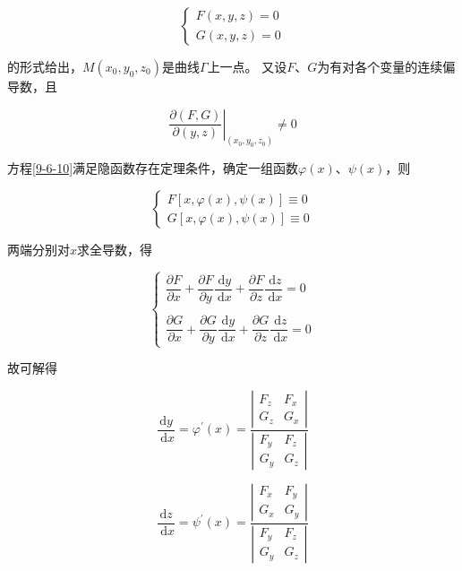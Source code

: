 \documentclass[12pt, a4paper]{article}
\numberwithin{equation}{section}
\begin{document}
    \begin{equation}
        \left\{\begin{array}{l}
            F(x, y, z)=0 \\
            G(x, y, z)=0
        \end{array}\right.
        \label{9-6-10}
    \end{equation}

    的形式给出，\(M\left(x_0,y_0,z_0\right)\)是曲线\(\varGamma\)上一点。
    又设\(F\)、\(G\)为有对各个变量的连续偏导数，且

    $$
        \left.\frac{\partial(F, G)}{\partial(y, z)}\right|_{\left(x_0, y_0, z_0\right)} \neq 0
    $$

    方程\ref{9-6-10}满足隐函数存在定理条件，确定一组函数\(\varphi(x)\)、\(\psi(x)\)，则

    $$
        \left\{\begin{array}{l}
            F[x, \varphi(x), \psi(x)] \equiv 0 \\
            G[x, \varphi(x), \psi(x)] \equiv 0
        \end{array}\right.
    $$

    两端分别对\(x\)求全导数，得

    $$
        \left\{\begin{array}{l}
            \dfrac{\partial F}{\partial x}+\dfrac{\partial F}{\partial y} \dfrac{\mathrm{~d} y}{\mathrm{~d} x}+
                \dfrac{\partial F}{\partial z} \dfrac{\mathrm{~d} z}{\mathrm{~d} x}=0 \\ \\
            \dfrac{\partial G}{\partial x}+\dfrac{\partial G}{\partial y} \dfrac{\mathrm{~d} y}{\mathrm{~d} x}+
                \dfrac{\partial G}{\partial z} \dfrac{\mathrm{~d} z}{\mathrm{~d} x}=0
        \end{array}\right.
    $$

    故可解得

    $$
        \frac{\mathrm{d} y}{\mathrm{~d} x}=\varphi^{\prime}(x)=\frac{\left|\begin{array}{ll}
        F_z & F_x \\
        G_z & G_x
        \end{array}\right|}{\left|\begin{array}{ll}
        F_y & F_z \\
        G_y & G_z
        \end{array}\right|}
    $$

    $$
        \frac{\mathrm{d} z}{\mathrm{~d} x}=\psi^{\prime}(x)=\frac{\left|\begin{array}{ll}
        F_x & F_y \\
        G_x & G_y
        \end{array}\right|}{\left|\begin{array}{ll}
        F_y & F_z \\
        G_y & G_z
        \end{array}\right|}
    $$
\end{document}
